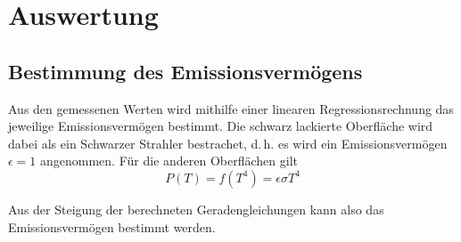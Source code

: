 \section{Auswertung}

\subsection{Bestimmung des Emissionsvermögens}

Aus den gemessenen Werten wird mithilfe einer linearen
Regressionsrechnung das jeweilige Emissionsvermögen bestimmt. Die schwarz
lackierte Oberfläche wird dabei als ein Schwarzer Strahler bestrachet,
d.\,h. es wird ein Emissionsvermögen $\epsilon = 1$ angenommen. Für die
anderen Oberflächen gilt
\begin{equation}
  P(T) = f(T^4) = \epsilon \sigma T^4
\end{equation}

Aus der Steigung der berechneten Geradengleichungen kann also das
Emissionsvermögen bestimmt werden.